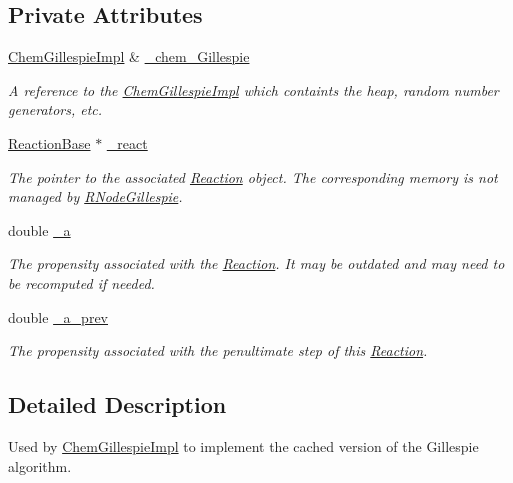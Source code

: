 \subsection*{Private Attributes}
\begin{DoxyCompactItemize}
\item 
\hyperlink{classChemGillespieImpl}{Chem\+Gillespie\+Impl} \& \hyperlink{classRNodeGillespie_a17f8b8b148da5586a31a5720e3f2b748}{\+\_\+chem\+\_\+\+Gillespie}
\begin{DoxyCompactList}\small\item\em A reference to the \hyperlink{classChemGillespieImpl}{Chem\+Gillespie\+Impl} which containts the heap, random number generators, etc. \end{DoxyCompactList}\item 
\hyperlink{classReactionBase}{Reaction\+Base} $\ast$ \hyperlink{classRNodeGillespie_a17e883bc0b90ba0aef2b5b41e505f066}{\+\_\+react}
\begin{DoxyCompactList}\small\item\em The pointer to the associated \hyperlink{classReaction}{Reaction} object. The corresponding memory is not managed by \hyperlink{classRNodeGillespie}{R\+Node\+Gillespie}. \end{DoxyCompactList}\item 
double \hyperlink{classRNodeGillespie_a6e27b71748a2fdaef116fc0a0f3b4781}{\+\_\+a}
\begin{DoxyCompactList}\small\item\em The propensity associated with the \hyperlink{classReaction}{Reaction}. It may be outdated and may need to be recomputed if needed. \end{DoxyCompactList}\item 
double \hyperlink{classRNodeGillespie_ae132221a1a09a566b08808c996f8b51c}{\+\_\+a\+\_\+prev}
\begin{DoxyCompactList}\small\item\em The propensity associated with the penultimate step of this \hyperlink{classReaction}{Reaction}. \end{DoxyCompactList}\end{DoxyCompactItemize}


\subsection{Detailed Description}
Used by \hyperlink{classChemGillespieImpl}{Chem\+Gillespie\+Impl} to implement the cached version of the Gillespie algorithm. 

